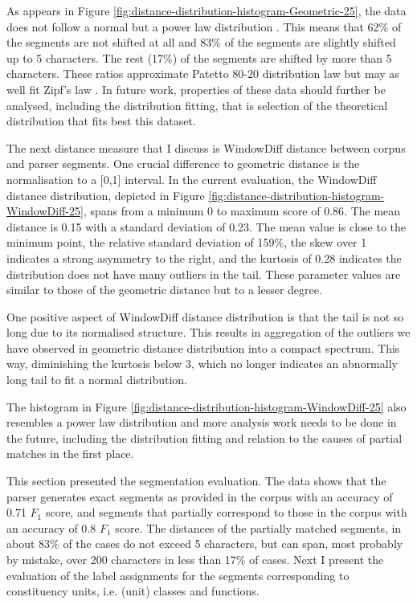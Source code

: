     As appears in Figure \ref{fig:distance-distribution-histogram-Geometric-25}, the data does not follow a normal but a power law distribution \citep{newman2005power}. This means that 62\% of the segments are not shifted at all and 83\% of the segments are slightly shifted up to 5 characters. The rest (17\%) of the segments are shifted by more than 5 characters. These ratios approximate Patetto 80-20 distribution law but may as well fit Zipf's law \citep{newman2005power}. In future work, properties of these data should further be analysed, including the distribution fitting, that is selection of the theoretical distribution that fits best this dataset.
    
    The next distance measure that I discuss is WindowDiff distance between corpus and parser segments. One crucial difference to geometric distance is the normalisation to a [0,1] interval. In the current evaluation, the WindowDiff distance distribution, depicted in Figure \ref{fig:distance-distribution-histogram-WindowDiff-25}, spans from a minimum 0 to maximum score of 0.86. The mean distance is 0.15 with a standard deviation of 0.23. The mean value is close to the minimum point, the relative standard deviation of 159\%, the skew over 1 indicates a strong asymmetry to the right, and the kurtosis of 0.28 indicates the distribution does not have many outliers in the tail. These parameter values are similar to those of the geometric distance but to a lesser degree. 
    
    One positive aspect of WindowDiff distance distribution is that the tail is not so long due to its normalised structure. This results in aggregation of the outliers we have observed in geometric distance distribution into a compact spectrum. This way, diminishing the kurtosis below 3, which no longer indicates an abnormally long tail to fit a normal distribution. 
    
    The histogram in Figure \ref{fig:distance-distribution-histogram-WindowDiff-25} also resembles a power law distribution and more analysis work needs to be done in the future, including the distribution fitting and relation to the causes of partial matches in the first place. 
    
    This section presented the segmentation evaluation. The data shows that the parser generates exact segments as provided in the corpus with an accuracy of 0.71 $F_1$ score, and segments that partially correspond to those in the corpus with an accuracy of 0.8 $F_1$ score. The distances of the partially matched segments, in about 83\% of the cases do not exceed 5 characters, but can span, most probably by mistake, over 200 characters in less than 17\% of cases. Next I present the evaluation of the label assignments for the segments corresponding to constituency units, i.e. (unit) classes and functions.

